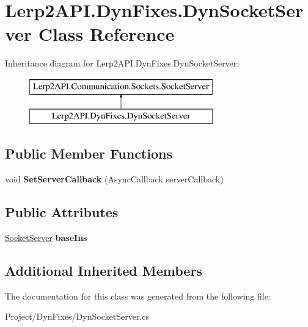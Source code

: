 \hypertarget{class_lerp2_a_p_i_1_1_dyn_fixes_1_1_dyn_socket_server}{}\section{Lerp2\+A\+P\+I.\+Dyn\+Fixes.\+Dyn\+Socket\+Server Class Reference}
\label{class_lerp2_a_p_i_1_1_dyn_fixes_1_1_dyn_socket_server}
Inheritance diagram for Lerp2\+A\+P\+I.\+Dyn\+Fixes.\+Dyn\+Socket\+Server\+:\begin{figure}[H]
\begin{center}
\leavevmode
\includegraphics[height=2.000000cm]{class_lerp2_a_p_i_1_1_dyn_fixes_1_1_dyn_socket_server}
\end{center}
\end{figure}
\subsection*{Public Member Functions}
\begin{DoxyCompactItemize}
\item 
\mbox{\label{class_lerp2_a_p_i_1_1_dyn_fixes_1_1_dyn_socket_server_a4554018530df5be7455826a2f2366025}} 
void {\bfseries Set\+Server\+Callback} (Async\+Callback server\+Callback)
\end{DoxyCompactItemize}
\subsection*{Public Attributes}
\begin{DoxyCompactItemize}
\item 
\mbox{\label{class_lerp2_a_p_i_1_1_dyn_fixes_1_1_dyn_socket_server_aaa808af59c66032fcc93ba7d94b7f028}} 
\hyperlink{class_lerp2_a_p_i_1_1_communication_1_1_sockets_1_1_socket_server}{Socket\+Server} {\bfseries base\+Ins}
\end{DoxyCompactItemize}
\subsection*{Additional Inherited Members}


The documentation for this class was generated from the following file\+:\begin{DoxyCompactItemize}
\item 
Project/\+Dyn\+Fixes/Dyn\+Socket\+Server.\+cs\end{DoxyCompactItemize}
